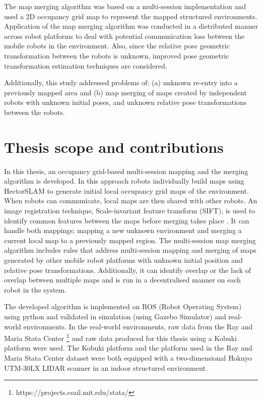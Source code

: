 The map merging algorithm was based on a multi-session implementation and used a 2D occupancy grid map to represent the mapped structured environments. Application of the map merging algorithm was conducted in a distributed manner across robot platforms to deal with potential communication loss between the mobile robots in the environment. Also, since the relative pose geometric transformation between the robots is unknown, improved pose geometric transformation estimation techniques are considered.

Additionally, this study addressed problems of: (a) unknown re-entry into a previously mapped area and (b) map merging of maps created by independent robots with unknown initial poses, and unknown relative pose transformations between the robots.


\section{Thesis scope and contributions}
\label{sec:ch1.section4}
In this thesis, an occupancy grid-based multi-session mapping and the merging algorithm is developed. In this approach robots individually build maps using HectorSLAM to generate initial local occupancy grid maps of the environment. When robots can communicate, local maps are then shared with other robots. An image registration technique, Scale-invariant feature transform (SIFT), is used to identify common features between the maps before merging takes place \cite{Kohlbrecher2011a}. It can handle both mappings; mapping a new unknown environment and merging a current local map to a previously mapped region. The multi-session map merging algorithm includes rules that address multi-session mapping and merging of maps generated by other mobile robot platforms with unknown initial position and relative pose transformations. Additionally, it can identify overlap or the lack of overlap between multiple maps and is run in a decentralised manner on each robot in the system. 

The developed algorithm is implemented on ROS (Robot Operating System) using python and validated in simulation (using Gazebo Simulator) and real-world environments. In the real-world environments, raw data from the Ray and Maria Stata Center \footnote{https://projects.csail.mit.edu/stata/} and raw data produced for this thesis using a Kobuki platform were used. The Kobuki platform and the platform used in the Ray and Maria Stata Center dataset were both equipped with a two-dimensional Hokuyo UTM-30LX LIDAR scanner in an indoor structured environment.

